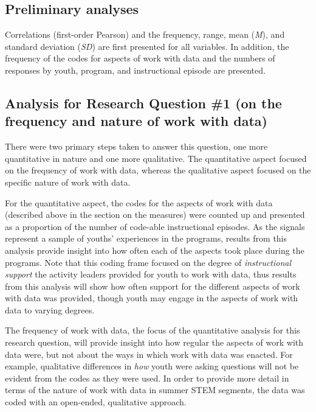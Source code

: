 \documentclass[]{msu-thesis}
\theoremstyle{definition}
\theoremstyle{definition}
\theoremstyle{definition}
\theoremstyle{remark}
\begin{document}
\subsection{Preliminary analyses}\label{preliminary-analyses}

Correlations (first-order Pearson) and the frequency, range, mean
(\emph{M}), and standard deviation (\emph{SD}) are first presented for
all variables. In addition, the frequency of the codes for aspects of
work with data and the numbers of responses by youth, program, and
instructional episode are presented.

\subsection{Analysis for Research Question \#1 (on the frequency and
nature of work with
data)}\label{analysis-for-research-question-1-on-the-frequency-and-nature-of-work-with-data}

There were two primary steps taken to answer this question, one more
quantitative in nature and one more qualitative. The quantitative aspect
focused on the frequency of work with data, whereas the qualitative
aspect focused on the specific nature of work with data.

For the quantitative aspect, the codes for the aspects of work with data
(described above in the section on the measures) were counted up and
presented as a proportion of the number of code-able instructional
episodes. As the signals represent a sample of youths' experiences in
the programs, results from this analysis provide insight into how often
each of the aspects took place during the programs. Note that this
coding frame focused on the degree of \emph{instructional support} the
activity leaders provided for youth to work with data, thus results from
this analysis will show how often support for the different aspects of
work with data was provided, though youth may engage in the aspects of
work with data to varying degrees.

The frequency of work with data, the focus of the quantitative analysis
for this research question, will provide insight into how regular the
aspects of work with data were, but not about the ways in which work
with data was enacted. For example, qualitative differences in
\emph{how} youth were asking questions will not be evident from the
codes as they were used. In order to provide more detail in terms of the
nature of work with data in summer STEM segments, the data was coded
with an open-ended, qualitative approach.
\end{document}
